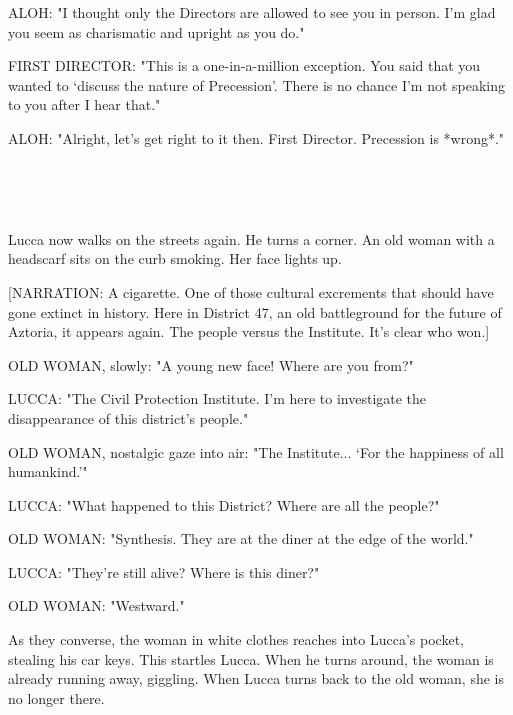 \documentclass[11pt]{article}
\begin{document}
ALOH: "I thought only the Directors are allowed to see you in person.
I'm glad you seem as charismatic and upright as you do."

FIRST DIRECTOR: "This is a one-in-a-million exception.
You said that you wanted to `discuss the nature of Precession'. 
There is no chance I'm not speaking to you after I hear that."

ALOH: "Alright, let's get right to it then. 
First Director. 
Precession is *wrong*."

\ 

\ 

Lucca now walks on the streets again.
He turns a corner.
An old woman with a headscarf sits on the curb smoking.
Her face lights up.

[NARRATION: A cigarette. 
One of those cultural excrements that should have gone extinct in history.
Here in District 47, an old battleground for the future of Aztoria, it appears again.
The people versus the Institute. 
It's clear who won.]

OLD WOMAN, slowly: "A young new face! Where are you from?"

LUCCA: "The Civil Protection Institute. I'm here to investigate the disappearance of this district's people."

OLD WOMAN, nostalgic gaze into air: "The Institute...
`For the happiness of all humankind.'"

LUCCA: "What happened to this District?
Where are all the people?"

OLD WOMAN: "Synthesis.
They are at the diner at the edge of the world."

LUCCA: "They're still alive? Where is this diner?"

OLD WOMAN: "Westward."

As they converse, the woman in white clothes reaches into Lucca's pocket, stealing his car keys. 
This startles Lucca.
When he turns around, the woman is already running away, giggling.
When Lucca turns back to the old woman, she is no longer there.

\ 

\ 
\end{document}
